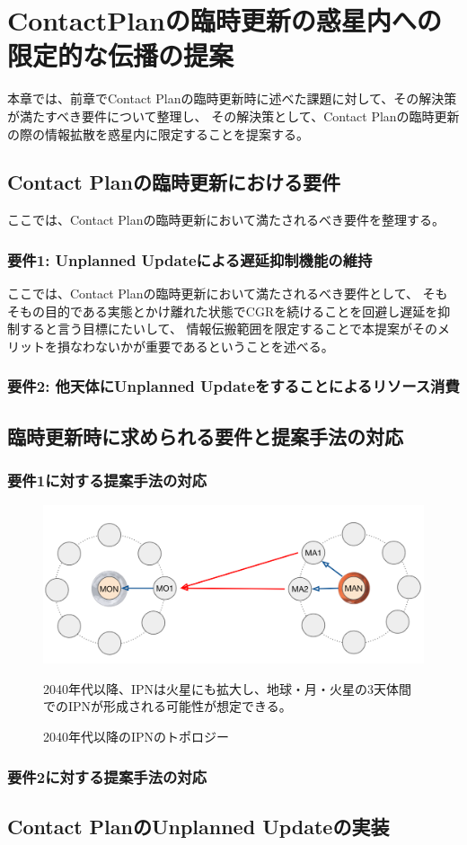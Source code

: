 \chapter{ContactPlanの臨時更新の惑星内への限定的な伝播の提案}
\label{chap:suggestion}
本章では、前章でContact Planの臨時更新時に述べた課題に対して、その解決策が満たすべき要件について整理し、
その解決策として、Contact Planの臨時更新の際の情報拡散を惑星内に限定することを提案する。

\section{Contact Planの臨時更新における要件}
ここでは、Contact Planの臨時更新において満たされるべき要件を整理する。
\subsection{要件1: Unplanned Updateによる遅延抑制機能の維持}
ここでは、Contact Planの臨時更新において満たされるべき要件として、
そもそもの目的である実態とかけ離れた状態でCGRを続けることを回避し遅延を抑制すると言う目標にたいして、
情報伝搬範囲を限定することで本提案がそのメリットを損なわないかが重要であるということを述べる。
\subsection{要件2: 他天体にUnplanned Updateをすることによるリソース消費}


\section{臨時更新時に求められる要件と提案手法の対応}

\subsection{要件1に対する提案手法の対応}
\begin{figure}[tbh]
    \centering
    \includegraphics[width=0.7\textheight]{img/ipn_topology.pdf}
    \caption{2040年代以降のIPNのトポロジー}
    \label{fig:dtnprotocolstack}
    \begin{minipage}{\textwidth}
        \raggedright
       2040年代以降、IPNは火星にも拡大し、地球・月・火星の3天体間でのIPNが形成される可能性が想定できる。
    \end{minipage}
\end{figure}

\subsection{要件2に対する提案手法の対応}

\section{Contact PlanのUnplanned Updateの実装}
